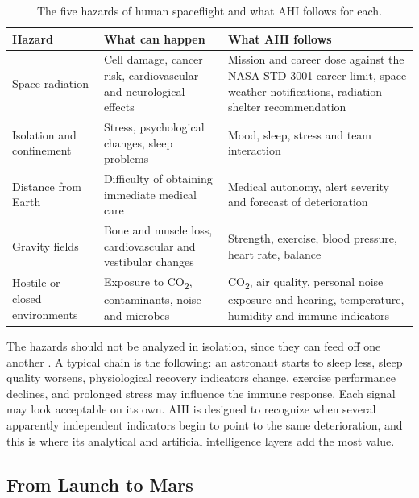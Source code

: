 \begin{table}[htbp]
\centering
\vspace{0.8em}
\caption{The five hazards of human spaceflight and what AHI follows for each.}
\label{tab:hazard-monitoring}
\small
\begin{tabular}{p{3.0cm}p{5.4cm}p{5.6cm}}
\hline
\textbf{Hazard} & \textbf{What can happen} & \textbf{What AHI follows} \\
\hline
Space radiation & Cell damage, cancer risk, cardiovascular and neurological effects & Mission and career dose against the NASA-STD-3001 career limit, space weather notifications, radiation shelter recommendation \\
Isolation and confinement & Stress, psychological changes, sleep problems & Mood, sleep, stress and team interaction \\
Distance from Earth & Difficulty of obtaining immediate medical care & Medical autonomy, alert severity and forecast of deterioration \\
Gravity fields & Bone and muscle loss, cardiovascular and vestibular changes & Strength, exercise, blood pressure, heart rate, balance \\
Hostile or closed environments & Exposure to CO\textsubscript{2}, contaminants, noise and microbes & CO\textsubscript{2}, air quality, personal noise exposure and hearing, temperature, humidity and immune indicators \\
\hline
\end{tabular}
\vspace{1.2em}
\end{table}

The hazards should not be analyzed in isolation, since they can feed off one another \cite{nasa_hrp_five_hazards}. A typical chain is the following: an astronaut starts to sleep less, sleep quality worsens, physiological recovery indicators change, exercise performance declines, and prolonged stress may influence the immune response. Each signal may look acceptable on its own. AHI is designed to recognize when several apparently independent indicators begin to point to the same deterioration, and this is where its analytical and artificial intelligence layers add the most value.

\subsection{From Launch to Mars}
\label{subsec:mission-profiles}

